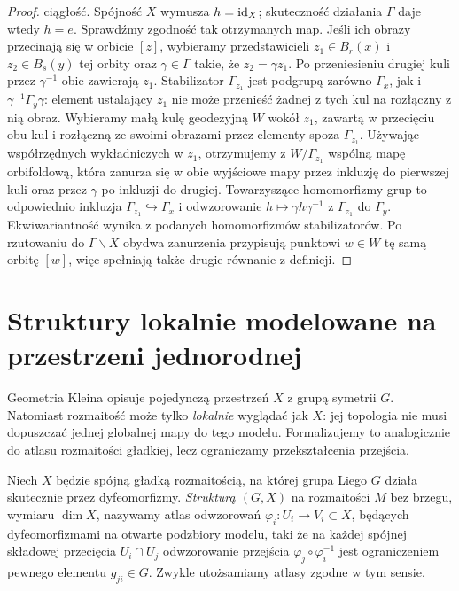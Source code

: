 \begin{proof}
ciągłość. Spójność $X$ wymusza $h=\mathrm{id}_X$;
skuteczność działania $\Gamma$ daje wtedy $h=e$.
Sprawdźmy zgodność tak otrzymanych map. Jeśli ich obrazy
przecinają się w orbicie $[z]$, wybieramy przedstawicieli
$z_1\in B_r(x)$ i $z_2\in B_s(y)$ tej orbity oraz
$\gamma\in\Gamma$ takie, że $z_2=\gamma z_1$.
Po przeniesieniu drugiej kuli przez $\gamma^{-1}$ obie
zawierają $z_1$. Stabilizator $\Gamma_{z_1}$ jest podgrupą
zarówno $\Gamma_x$, jak i $\gamma^{-1}\Gamma_y\gamma$:
element ustalający $z_1$ nie może przenieść żadnej z tych
kul na rozłączny z nią obraz. Wybieramy małą kulę
geodezyjną $W$ wokół $z_1$, zawartą w przecięciu obu kul
i rozłączną ze swoimi obrazami przez elementy spoza
$\Gamma_{z_1}$. Używając współrzędnych wykładniczych w
$z_1$, otrzymujemy z $W/\Gamma_{z_1}$ wspólną mapę
orbifoldową, która zanurza
się w obie wyjściowe mapy przez inkluzję do pierwszej kuli
oraz przez $\gamma$ po inkluzji do drugiej. Towarzyszące
homomorfizmy grup to odpowiednio inkluzja
$\Gamma_{z_1}\hookrightarrow\Gamma_x$ i odwzorowanie
$h\mapsto\gamma h\gamma^{-1}$ z $\Gamma_{z_1}$ do
$\Gamma_y$.
Ekwiwariantność wynika z podanych homomorfizmów
stabilizatorów. Po rzutowaniu do $\Gamma\backslash X$
obydwa zanurzenia przypisują punktowi $w\in W$ tę samą
orbitę $[w]$, więc spełniają także drugie równanie
z definicji.
\end{proof}

\section{Struktury lokalnie modelowane na przestrzeni jednorodnej}
\label{sec:thur-dop-struktury-gx}
Geometria Kleina opisuje pojedynczą przestrzeń $X$ z grupą
symetrii $G$. Natomiast rozmaitość może tylko \emph{lokalnie}
wyglądać jak $X$: jej topologia nie musi dopuszczać
jednej globalnej mapy do tego modelu. Formalizujemy to
analogicznie do atlasu rozmaitości gładkiej, lecz ograniczamy
przekształcenia przejścia.

\begin{definicja}
\label{def:thur-dop-gx-atlas}
Niech $X$ będzie spójną gładką rozmaitością, na której grupa Liego
$G$ działa skutecznie przez dyfeomorfizmy. \emph{Strukturą $(G,X)$}
na rozmaitości $M$ bez brzegu, wymiaru $\dim X$, nazywamy atlas odwzorowań
$\varphi_i:U_i\to V_i\subset X$, będących dyfeomorfizmami
na otwarte podzbiory modelu, taki że na każdej spójnej składowej
przecięcia $U_i\cap U_j$ odwzorowanie przejścia
$\varphi_j\circ\varphi_i^{-1}$ jest ograniczeniem
pewnego elementu $g_{ji}\in G$. Zwykle utożsamiamy atlasy
zgodne w tym sensie.
\end{definicja}

